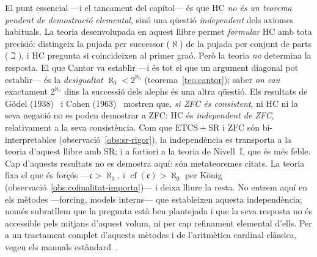 \begin{observacio}\label{obs:hc-independencia}
El punt essencial ---i el tancament del capítol--- és que HC \emph{no és un
teorema pendent de demostració elemental}, sinó una qüestió \emph{independent}
dels axiomes habituals. La teoria desenvolupada en aquest llibre permet
\emph{formular} HC amb tota precisió: distingeix la pujada per successor
(\(\aleph\)) de la pujada per conjunt de parts (\(\beth\)), i HC pregunta si
coincideixen al primer graó. Però la teoria \emph{no} determina la resposta.
El que Cantor va establir ---i és tot el que un argument diagonal pot
establir--- és la \emph{desigualtat} \(\aleph_0<2^{\aleph_0}\)
(teorema~\ref{teo:cantor}); saber \emph{on cau} exactament \(2^{\aleph_0}\) dins
la successió dels alephs és una altra qüestió. Els resultats de Gödel (1938)~\cite{godel1940} i
Cohen (1963)~\cite{cohen1966} mostren que, \emph{si ZFC és consistent}, ni HC ni la seva negació no es
poden demostrar a ZFC: HC és \emph{independent de ZFC}, relativament a la
seva consistència. Com que ETCS${}+{}$SR i ZFC són bi-interpretables
(observació~\ref{obs:sr-rigor}), la independència es transporta a la teoria
d'aquest llibre amb SR; i a fortiori a la teoria de Nivell~I, que és més
feble. Cap d'aquests resultats no es demostra aquí: són metateoremes citats. La teoria fixa el que
és forçós ---\(\mathfrak c>\aleph_0\), i \(\operatorname{cf}(\mathfrak c)>\aleph_0\)
per König (observació~\ref{obs:cofinalitat-importa})--- i deixa lliure la resta.
No entrem aquí en els mètodes ---forcing, models interns--- que estableixen
aquesta independència; només subratllem que la pregunta està ben plantejada i
que la seva resposta no és accessible pels mitjans d'aquest volum, ni per cap
refinament elemental d'ells. Per a un tractament complet d'aquests mètodes i de
l'aritmètica cardinal clàssica, vegeu els manuals estàndard~\cite{jech2003,kunen2011}.
\end{observacio}

